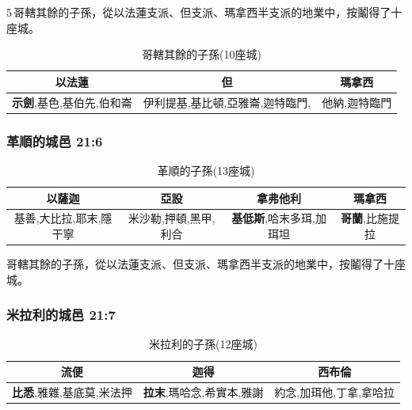 5 哥轄其餘的子孫，從以法蓮支派、但支派、瑪拿西半支派的地業中，按鬮得了十座城。

\begin{table}[H]
\centering
\begin{tabular}{|c|c|c|}
\hline
\hline
 以法蓮&但&瑪拿西 \\\hline
 \textbf{示劍},基色,基伯先,伯和崙& 伊利提基,基比頓,亞雅崙,迦特臨門,& 他納,迦特臨門\\\hline
\end{tabular}
\caption{哥轄其餘的子孫(10座城)}
\end{table}

\subsubsection{革順的城邑 21:6}
\begin{table}[H]
\centering
\begin{tabular}{|c|c|c|c|}
\hline
\hline
 以薩迦&亞設&拿弗他利&瑪拿西\\\hline
基善,大比拉,耶末,隱干寧&米沙勒,押頓,黑甲,利合  &\textbf{基低斯},哈末多珥,加珥坦  & \textbf{哥蘭},比施提拉\\\hline
\end{tabular}
\caption{革順的子孫(13座城)}
\end{table}
哥轄其餘的子孫，從以法蓮支派、但支派、瑪拿西半支派的地業中，按鬮得了十座城。

\subsubsection{米拉利的城邑 21:7}
\begin{table}[H]
\centering
\begin{tabular}{|c|c|c|}
\hline
\hline
 流便&迦得&西布倫\\\hline
 \textbf{比悉},雅雜,基底莫,米法押 &\textbf{拉末},瑪哈念,希實本,雅謝  & 約念,加珥他,丁拿,拿哈拉 \\\hline
\end{tabular}
\caption{米拉利的子孫(12座城)}
\end{table}

